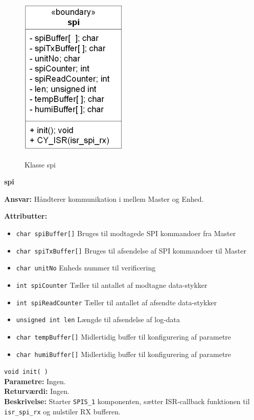 
\begin{figure}[htbp] \centering
{\includegraphics[scale=1.3]{filer/design/Klassediagrammer/sw_psoc_SPIhandler}}
\caption{Klasse spi}
\label{fig:sw_psoc_class_spi}
\end{figure} 

{\centering
\textbf{spi}\par
}
\textbf{Ansvar:} Håndterer kommunikation i mellem Master og Enhed. \

\textbf{Attributter:}
\begin{itemize}
	\item \verb+char spiBuffer[]+ Bruges til modtagede SPI kommandoer fra Master
	\item \verb+char spiTxBuffer[]+ Bruges til afsendelse af SPI kommandoer til Master
	\item \verb+char unitNo+ Enheds nummer til verificering
	\item \verb+int spiCounter+ Tæller til antallet af modtagne data-stykker
	\item \verb+int spiReadCounter+ Tæller til antallet af afsendte data-stykker
	\item \verb+unsigned int len+ Længde til afsendelse af log-data
	\item \verb+char tempBuffer[]+ Midlertidig buffer til konfigurering af parametre
	\item \verb+char humiBuffer[]+ Midlertidig buffer til konfigurering af parametre
\end{itemize}

\verb+void init( ) +\\
\textbf{Parametre:} Ingen. \\
\textbf{Returværdi:} Ingen. \\
\textbf{Beskrivelse:} Starter \verb+SPIS_1+ komponenten, sætter ISR-callback funktionen til \verb+isr_spi_rx+ og nulstiler RX bufferen. \\

